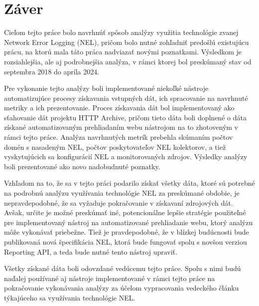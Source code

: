 \chapter{Záver}
\label{zaver}

Cieľom tejto práce bolo navrhnúť spôsob analýzy využitia technológie zvanej Network Error Logging (NEL), pričom bolo nutné zohľadniť predošlú existujúcu prácu, na ktorú mala táto práca nadviazať novými poznatkami.
Výsledkom je rozsiahlejšia, ale aj podrobnejšia analýza, v rámci ktorej bol preskúmaný stav od septembra 2018 do apríla 2024.

Pre vykonanie tejto analýzy boli implementované niekoľké nástroje automatizujúce procesy získavania vstupných dát, ich spracovanie na navrhnuté metriky a ich prezentovanie.
Proces získavania dát bol implementovaný ako sťahovanie dát projektu HTTP Archive, pričom tieto dáta boli doplnené o dáta získané automatizovaným prehliadaním webu nástrojom na to zhotoveným v rámci tejto práce. 
Analýza navrhnutých metrík prebehla skúmaním počtov domén s nasadeným NEL, počtov poskytovateľov NEL kolektorov, a tiež vyskytujúcich sa konfigurácií NEL a monitorovaných zdrojov.
Výsledky analýzy boli prezentované ako novo nadobudnuté poznatky.

Vzhľadom na to, že sa v tejto práci podarilo získať všetky dáta, ktoré sú potrebné na podrobnú analýzu využívania technológie NEL za preskúmané obdobie, je nepravdepodobné, že sa vyžaduje pokračovanie v získavaní zdrojových dát.
Avšak, určite je možné preskúmať iné, potencionálne lepšie stratégie použiteľné pre implementovaný nástroj na automatizované prehliadanie webu, ktorý analýzu môže vykonávať priebežne.
Tiež je pravdepodobné, že v blízkej budúcnosti bude publikovaná nová špecifikácia NEL, ktorá bude fungovať spolu s novšou verziou Reporting API, a teda bude nutné tento nástroj upraviť.

Všetky získané dáta boli odovzdané vedúcemu tejto práce.
Spolu s nimi budú naďalej používané aj nástroje implementované v rámci tejto práce na pokračovanie vykonávania analýzy za účelom vypracovania vedeckého článku týkajúceho sa využívania technológie NEL. 
